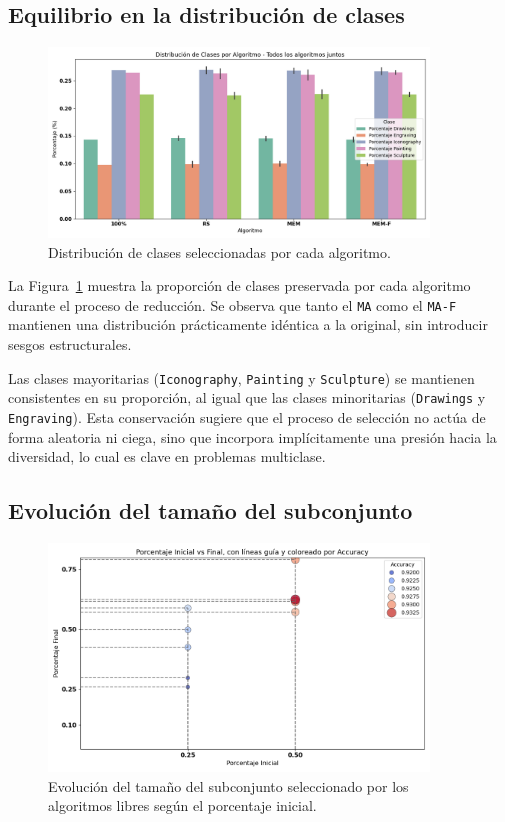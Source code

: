 \subsection{Equilibrio en la distribución de clases}
\begin{figure}[htp]
    \centering
    \includegraphics[width=0.9\textwidth]{imagenes/evaluaciones/painting/balance-de-clases-por-algoritmo.png}
    \caption{Distribución de clases seleccionadas por cada algoritmo.}
    \label{fig:balance_clases_painting}
\end{figure}

La Figura~\ref{fig:balance_clases_painting} muestra la proporción de clases preservada por cada algoritmo durante el proceso de reducción.
Se observa que tanto el \texttt{MA} como el \texttt{MA-F} mantienen una distribución prácticamente idéntica a la original,
sin introducir sesgos estructurales.

Las clases mayoritarias (\texttt{Iconography}, \texttt{Painting} y \texttt{Sculpture}) se mantienen consistentes en su proporción,
al igual que las clases minoritarias (\texttt{Drawings} y \texttt{Engraving}).
Esta conservación sugiere que el proceso de selección no actúa de forma aleatoria ni ciega,
sino que incorpora implícitamente una presión hacia la diversidad, lo cual es clave en problemas multiclase.

\subsection{Evolución del tamaño del subconjunto}
\begin{figure}[htp]
    \centering
    \includegraphics[width=0.9\textwidth]{imagenes/evaluaciones/painting/scatter-por-porcentaje.png}
    \caption{Evolución del tamaño del subconjunto seleccionado por los algoritmos libres según el porcentaje inicial.}
    \label{fig:evolucion_porcentaje_libre}
\end{figure}

